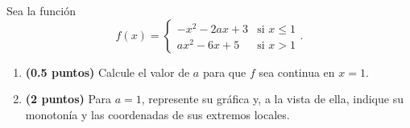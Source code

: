 
Sea la función
\[
f(x)=\begin{cases}-x^2-2ax+3&\text{si }x\leq1\\[0.4em]ax^2-6x+5&\text{si }x>1\end{cases}.
\]
\begin{enumerate}[label=\alph*)]
\item \textbf{(0.5 puntos)} Calcule el valor de $a$ para que $f$ sea continua en $x=1$.
\item \textbf{(2 puntos)} Para $a=1$, represente su gráfica y, a la vista de ella, indique su monotonía y las coordenadas de sus extremos locales.
\end{enumerate}

